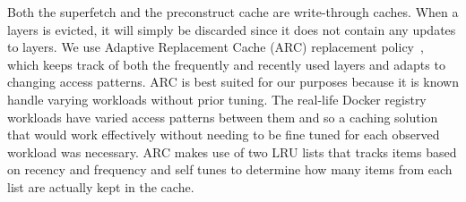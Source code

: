 Both the superfetch and the preconstruct cache are write-through caches.
When a layers is evicted, it will simply be discarded since it does not contain any
updates to layers.
%
We use Adaptive Replacement Cache (ARC) replacement policy~\cite{megiddo2003arc}, which keeps track of both the frequently and recently used layers and adapts to changing access patterns. ARC is best suited for our purposes because it is known handle varying workloads without prior tuning. The real-life Docker registry workloads have varied access patterns between them and so a caching solution that would work effectively without needing to be fine tuned for each observed workload was necessary. ARC makes use of two LRU lists that tracks items based on recency and frequency and self tunes to determine how many items from each list are actually kept in the cache.  
%


